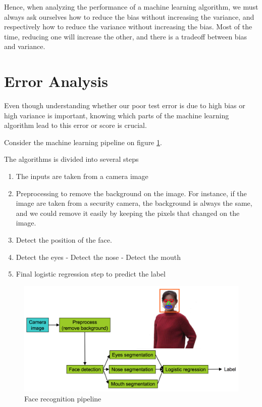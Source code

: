 \documentclass[12pt]{article}
\begin{document}
Hence, when analyzing the performance of a machine learning algorithm, we must always ask ourselves how to reduce the bias without increasing the variance, and respectively how to reduce the variance without increasing the bias. Most of the time, reducing one will increase the other, and there is a tradeoff between bias and variance.

\section{Error Analysis}

Even though understanding whether our poor test error is due to high bias or high variance is important, knowing which parts of the machine learning algorithm lead to this error or score is crucial.

Consider the machine learning pipeline on figure \ref{pipeline}.

The algorithms is divided into several steps
\begin{enumerate}
	\item The inputs are taken from a camera image
	\item Preprocessing to remove the background on the image. For instance, if the image are taken from a security camera, the background is always the same, and we could remove it easily by keeping the pixels that changed on the image.
	\item Detect the position of the face.
	\item Detect the eyes - Detect the nose - Detect the mouth
	\item Final logistic regression step to predict the label
\end{enumerate}

\begin{figure}[h!]
	\centering
	\includegraphics[width=\textwidth]{pipeline.png}
	\caption{Face recognition pipeline}
	\label{pipeline}
\end{figure}
\end{document}
